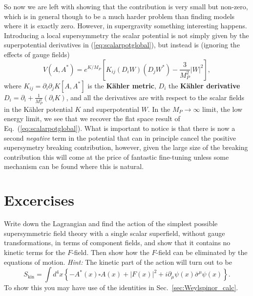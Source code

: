 \documentclass[notes.tex]{subfiles}
\begin{document}
So now we are left with showing that the contribution is very small but non-zero, which is in general though to be a much harder problem than finding models where it  is exactly zero.
However, in supergravity something interesting happens. Introducing a local supersymmetry the scalar potential is not simply given by the superpotential derivatives in (\ref{eq:scalarpotglobal}), but instead is (ignoring the effects of gauge fields)
\begin{equation}
V(A,A^*) = e^{K/M_P}\left[K_{ij}(D_iW)(D_jW^*)-\frac{3}{M_P^2}|W|^2\right],
\end{equation}
where $K_{ij}=\partial_i\partial_jK[A,A^*]$ is the {\bf Kähler metric},  $D_i$ the {\bf Kähler derivative} $D_i = \partial_i +\frac{1}{M_P^2}(\partial_iK)$, and all the derivatives are with respect to the scalar fields in the Kähler potential $K$ and superpotential $W$. In the $M_P\to \infty$ limit, the low energy limit, we see that we recover the flat space result of Eq.~(\ref{eq:scalarpotglobal}). What is important to notice is that  there is now a second {\it negative} term in the potential that can in principle cancel the positive supersymetry breaking contribution, however, given the large size of the breaking contribution this will come at the price of fantastic fine-tuning unless some mechanism can be found where this is natural.



\section{Excercises}

\begin{Exercise}[]
\label{ex:simpleL}
Write down the Lagrangian and find the action of the simplest possible supersymmetric field theory with a single scalar superfield, without gauge transformations, in terms of component fields, and show that it contains no kinetic terms for the $F$-field. Then show how the $F$-field can be eliminated by the equations of motion. {\it Hint:} The kinetic part of the action will turn out to be
\begin{equation}
S_\text{kin}=\int d^4x \left\{-A^*(x)\square A(x)+|F(x)|^2+i\partial_\mu\psi(x)\bar\sigma^\mu\psi(x)\right\}.
\end{equation}
To show this you may have use of the identities in Sec.~\ref{sec:Weylspinor_calc}.
\end{Exercise}
\end{document}
